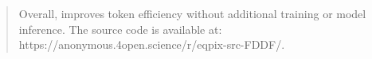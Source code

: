 \begin{abstract}
    Overall, \name improves token efficiency without additional training or model inference.
    The source code is available at: https://anonymous.4open.science/r/eqpix-src-FDDF/.
    \end{abstract}
    